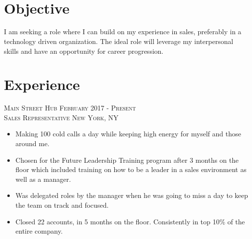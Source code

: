 \documentclass[oneside, final]{scrartcl}
\begin{document}
\begin{center}
 
\textsc{\LARGE{}}\\
\\



\section{Objective}
\begin{flushleft}
I am seeking a role where I can build on my experience in sales, preferably in a technology driven
organization. The ideal role will leverage my interpersonal skills and have an opportunity for career progression.
\end{flushleft}



\section{Experience}


\textsc{Main Street Hub \hfill February 2017 - Present \\}
\textsc{Sales Representative \hfill New York, NY\\}
\begin{itemize}
	\setlength{\itemsep}{1pt}
	\setlength{\parskip}{0pt}
	\setlength{\parsep}{0pt}
	\setlength{\leftmargin}{-5mm}
\item Making 100 cold calls a day while keeping high energy for myself and those around me.
\item Chosen for the Future Leadership Training program after 3 months on the floor which included training on how to be a leader in a sales environment as well as a manager.
\item Was delegated roles by the manager when he was going to miss a day to keep the team on track and focused.
\item Closed 22 accounts, in 5 months on the floor. Consistently in top 10\% of the entire company.
\end{itemize}





\end{center}
\end{document}
